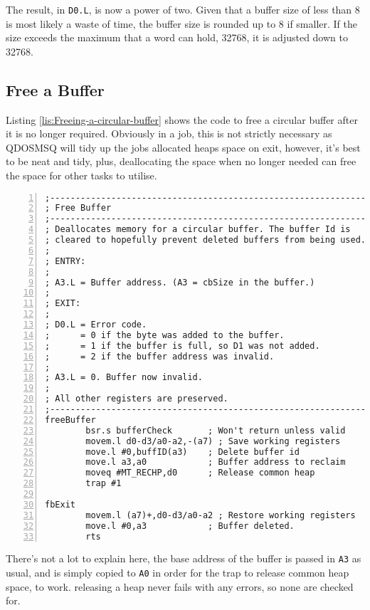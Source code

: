 The result, in \texttt{D0.L}, is now a power of two. Given that a
buffer size of less than 8 is most likely a waste of time, the buffer
size is rounded up to 8 if smaller. If the size exceeds the maximum
that a word can hold, 32768, it is adjusted down to 32768.

\subsection{Free a Buffer}

Listing \ref{lis:Freeing-a-circular-buffer} shows the code to free
a circular buffer after it is no longer required. Obviously in a job,
this is not strictly necessary as QDOSMSQ will tidy up the jobs allocated
heaps space on exit, however, it's best to be neat and tidy, plus,
deallocating the space when no longer needed can free the space for
other tasks to utilise.

\begin{lstlisting}[caption={Freeing a circular buffer},label={lis:Freeing-a-circular-buffer},numbers=left,showstringspaces=false,tabsize=4]
;--------------------------------------------------------------
; Free Buffer
;--------------------------------------------------------------
; Deallocates memory for a circular buffer. The buffer Id is 
; cleared to hopefully prevent deleted buffers from being used.
; 
; ENTRY:
;
; A3.L = Buffer address. (A3 = cbSize in the buffer.)
;
; EXIT:
;
; D0.L = Error code.
;      = 0 if the byte was added to the buffer.
;      = 1 if the buffer is full, so D1 was not added.
;      = 2 if the buffer address was invalid.
;
; A3.L = 0. Buffer now invalid.
;
; All other registers are preserved.
;--------------------------------------------------------------
freeBuffer
        bsr.s bufferCheck       ; Won't return unless valid
        movem.l d0-d3/a0-a2,-(a7) ; Save working registers
        move.l #0,buffID(a3)    ; Delete buffer id
        move.l a3,a0            ; Buffer address to reclaim
        moveq #MT_RECHP,d0      ; Release common heap
        trap #1

fbExit
        movem.l (a7)+,d0-d3/a0-a2 ; Restore working registers
        move.l #0,a3            ; Buffer deleted.
        rts

\end{lstlisting}

There's not a lot to explain here, the base address of the buffer
is passed in \texttt{A3} as usual, and is simply copied to \texttt{A0}
in order for the trap to release common heap space, to work. releasing
a heap never fails with any errors, so none are checked for.

